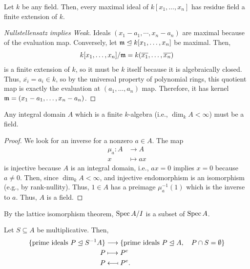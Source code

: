 \documentclass[12pt]{article}
\begin{document}
\begin{thm}
    Let $k$ be any field. Then, every maximal ideal of $k[x_1,\dots,x_n]$ has residue field a finite extension of $k$.
\end{thm}

\begin{proof}[Nullstellensatz implies Weak]
    Ideals $(x_1-a_1,\cdots,x_n-a_n)$ are maximal because of the evaluation map. Conversely, let $\mathfrak{m} \trianglelefteq k[x_1,\dots,x_n]$ be maximal. Then,
    \[k[x_1,\dots,x_n]/\mathfrak{m} = k(\overline{x_1},\dots,\overline{x_n})\]
    is a finite extension of $k$, so it must be $k$ itself because it is algebraically closed. Thus, $\overline{x_i}=a_i \in k$, so by the universal property of polynomial rings, this quotient map is exactly the evaluation at $(a_1,\dots,a_n)$ map. Therefore, it has kernel $\mathfrak{m}=(x_1-a_1,\dots,x_n-a_n)$.
\end{proof}

\begin{prop}
    Any integral domain $A$ which is a finite $k$-algebra (i.e., $\dim_k A <\infty$) must be a field.
\end{prop}

\begin{proof}
    We look for an inverse for a nonzero $a\in A$. The map
    \begin{align*}
        \mu_a: A &\longrightarrow A\\
        x &\longmapsto ax
    \end{align*}
    is injective because $A$ is an integral domain, i.e., $ax=0$ implies $x=0$ because $a\neq 0$. Then, since $\dim_k A <\infty$, and injective endomorphism is an isomorphism (e.g., by rank-nullity). Thus, $1\in A$ has a preimage $\mu_a^{-1}(1)$ which is the inverse to $a$. Thus, $A$ is a field.
\end{proof}

\begin{defn}
    By the lattice isomorphism theorem, $\operatorname{Spec} A/I$ is a subset of $\operatorname{Spec} A$.
\end{defn}

\begin{prop}
    Let $S\subseteq A$ be multiplicative. Then,
    \begin{align*}
        \{\text{prime ideals } P\trianglelefteq S^{-1}A\} &\longrightarrow \{\text{prime ideals } P\trianglelefteq A, \quad P\cap S=\emptyset\}\\
        P &\longmapsto P^c\\
        P &\longmapsfrom P^e.
    \end{align*}
\end{prop}
\end{document}
